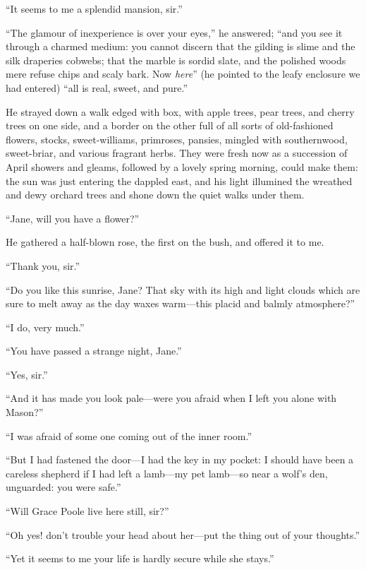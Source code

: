 \enquote{It seems to me a splendid mansion, sir.}

\enquote{The glamour of inexperience is over your eyes,} he answered;
\enquote{and you see it through a charmed medium: you cannot discern that the
	gilding is slime and the silk draperies cobwebs; that the marble is
	sordid slate, and the polished woods mere refuse chips and scaly bark.
	Now \emph{here}} (he pointed to the leafy enclosure we had entered)
\enquote{all is real, sweet, and pure.}

He strayed down a walk edged with box, with apple trees, pear trees, and
cherry trees on one side, and a border on the other full of all sorts of
old-fashioned flowers, stocks, sweet-williams, primroses, pansies,
mingled with southernwood, sweet-briar, and various fragrant herbs.
They were fresh now as a succession of April showers and gleams,
followed by a lovely spring morning, could make them: the sun was just
entering the dappled east, and his light illumined the wreathed and dewy
orchard trees and shone down the quiet walks under them.

\enquote{Jane, will you have a flower?}

He gathered a half-blown rose, the first on the bush, and offered it to
me.

\enquote{Thank you, sir.}

\enquote{Do you like this sunrise, Jane? That sky with its high and
	light clouds which are sure to melt away as the day waxes warm---this
	placid and balmly atmosphere?}

\enquote{I do, very much.}

\enquote{You have passed a strange night, Jane.}

\enquote{Yes, sir.}

\enquote{And it has made you look pale---were you afraid when I left you
	alone with Mason?}

\enquote{I was afraid of some one coming out of the inner room.}

\enquote{But I had fastened the door---I had the key in my pocket: I
	should have been a careless shepherd if I had left a lamb---my pet
	lamb---so near a wolf's den, unguarded: you were safe.}

\enquote{Will Grace Poole live here still, sir?}

\enquote{Oh yes! don't trouble your head about her---put the thing out
	of your thoughts.}

\enquote{Yet it seems to me your life is hardly secure while she stays.}

